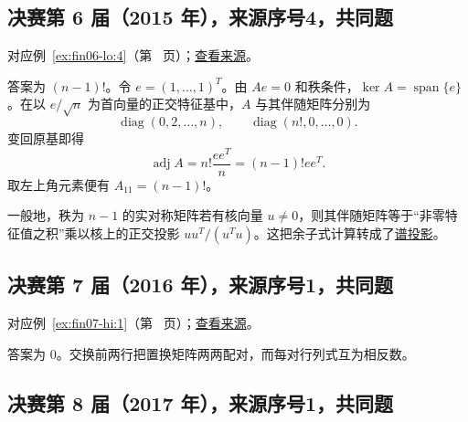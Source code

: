 \documentclass[12pt,fontset=fandol]{ctexart}
\begin{document}
\subsection{决赛第 6 届（2015 年），来源序号4，共同题}\label{ans:fin06-lo:4}\label{pr:fin06-lo:4}

对应例~\ref{ex:fin06-lo:4}（第~\pageref{ex:fin06-lo:4} 页）；\href{https://github.com/lzxcr/cmc-mathematics/blob/64916fa1fdbc3e444a652eca204d5669058ee321/src/problems/finals/06/04.md}{查看来源}。

\begin{solve}

答案为 $(n-1)!$。令 $e=(1,\ldots,1)^T$。由 $Ae=0$ 和秩条件，$\ker A=\operatorname{span}\{e\}$。在以 $e/\sqrt n$ 为首向量的正交特征基中，$A$ 与其伴随矩阵分别为
\[
\operatorname{diag}(0,2,\ldots,n),\qquad
\operatorname{diag}(n!,0,\ldots,0).
\]
变回原基即得
\[
\operatorname{adj}A=n!\frac{ee^T}{n}=(n-1)!ee^T.
\]
取左上角元素便有 $A_{11}=(n-1)!$。

\end{solve}

\begin{remark}[方法与条件]

一般地，秩为 $n-1$ 的实对称矩阵若有核向量 $u\ne0$，则其伴随矩阵等于“非零特征值之积”乘以核上的正交投影 $uu^T/(u^Tu)$。这把余子式计算转成了\hyperref[app:linear-spectral]{谱投影}。

\end{remark}

\subsection{决赛第 7 届（2016 年），来源序号1，共同题}\label{ans:fin07-hi:1}\label{pr:fin07-hi:1}

对应例~\ref{ex:fin07-hi:1}（第~\pageref{ex:fin07-hi:1} 页）；\href{https://github.com/lzxcr/cmc-mathematics/blob/64916fa1fdbc3e444a652eca204d5669058ee321/src/problems/finals/07/01.md}{查看来源}。

\begin{solve}

答案为 $0$。交换前两行把置换矩阵两两配对，而每对行列式互为相反数。

\end{solve}

\subsection{决赛第 8 届（2017 年），来源序号1，共同题}\label{ans:fin08-hi:1}\label{pr:fin08-hi:1}
\end{document}

